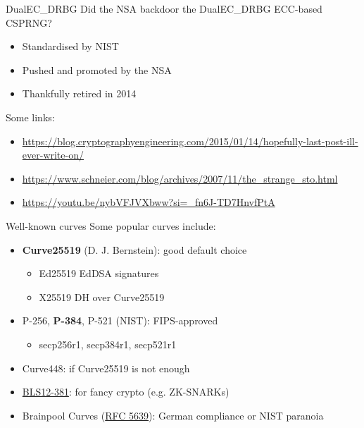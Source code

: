 \begin{frame}{DualEC\_DRBG}
  Did the NSA backdoor the DualEC\_DRBG ECC-based CSPRNG?
  \begin{itemize}[<+(1)->]
    \item Standardised by NIST
    \item Pushed and promoted by the NSA
    \item Thankfully retired in 2014
  \end{itemize}

  \pause
  Some links:
  \begin{itemize}
    \item {\scriptsize\url{https://blog.cryptographyengineering.com/2015/01/14/hopefully-last-post-ill-ever-write-on/}}
    \item {\scriptsize\url{https://www.schneier.com/blog/archives/2007/11/the_strange_sto.html}}
    \item {\scriptsize\url{https://youtu.be/nybVFJVXbww?si=_fn6J-TD7HnvfPtA}}
  \end{itemize}
\end{frame}

\begin{frame}{Well-known curves}
  \label{slide:curve-ex}
  Some popular curves include:
  \begin{itemize}[<+(1)->]
    \item \textbf{Curve25519} (D. J. Bernstein): good default choice
    \begin{itemize}
      \item Ed25519 EdDSA signatures
      \item X25519 DH over Curve25519
    \end{itemize}
    \item P-256, \textbf{P-384}, P-521 (NIST): FIPS-approved
    \begin{itemize}
      \item secp256r1, secp384r1, secp521r1 
    \end{itemize}
    \item Curve448: if Curve25519 is not enough
    \item \href{https://hackmd.io/@benjaminion/bls12-381}{BLS12-381}: for fancy crypto (e.g. ZK-SNARKs)
    \item Brainpool Curves (\href{https://datatracker.ietf.org/doc/html/rfc5639}{RFC 5639}): German compliance or NIST paranoia
  \end{itemize}
\end{frame}

